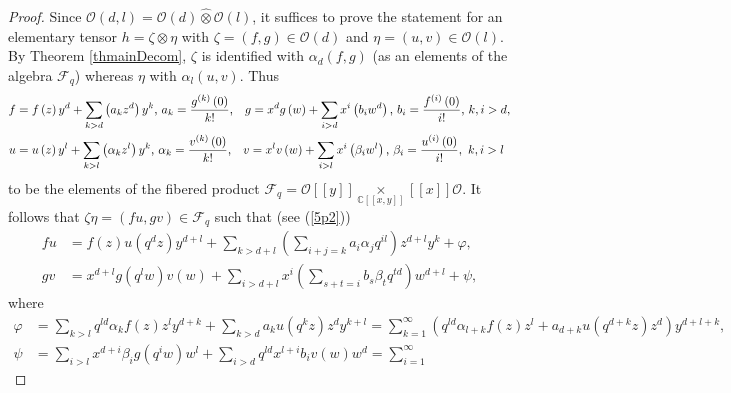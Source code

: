 \documentclass[12pt,reqno]{amsart}%
\theoremstyle{plain}
\numberwithin{theorem}{section} \numberwithin{equation}{section}
\numberwithin{lemma}{section}
\numberwithin{remark}{section}
\numberwithin{example}{section}
\numberwithin{proposition}{section}
\numberwithin{definition}{section}
\numberwithin{corollary}{section}
\begin{document}
\begin{proof}
Since $\mathcal{O}\left(  d,l\right)  =\mathcal{O}\left(  d\right)
\widehat{\otimes}\mathcal{O}\left(  l\right)  $, it suffices to prove the
statement for an elementary tensor $h=\zeta\otimes\eta$ with $\zeta=\left(
f,g\right)  \in\mathcal{O}\left(  d\right)  $ and $\eta=\left(  u,v\right)
\in\mathcal{O}\left(  l\right)  $. By Theorem \ref{thmainDecom}, $\zeta$ is
identified with $\alpha_{d}\left(  f,g\right)  $ (as an elements of the
algebra $\mathcal{F}_{q}$) whereas $\eta$ with $\alpha_{l}\left(  u,v\right)
$. Thus
\begin{align*}
f  &  =f\left(  z\right)  y^{d}+\sum_{k>d}\left(  a_{k}z^{d}\right)
y^{k}\text{, }a_{k}=\dfrac{g^{\left(  k\right)  }\left(  0\right)  }%
{k!}\text{,\quad}g=x^{d}g\left(  w\right)  +\sum_{i>d}x^{i}\left(  b_{i}%
w^{d}\right)  \text{, }b_{i}=\dfrac{f^{\left(  i\right)  }\left(  0\right)
}{i!}\text{, }k,i>d,\\
u  &  =u\left(  z\right)  y^{l}+\sum_{k>l}\left(  \alpha_{k}z^{l}\right)
y^{k}\text{, }\alpha_{k}=\dfrac{v^{\left(  k\right)  }\left(  0\right)  }%
{k!}\text{,\quad}v=x^{l}v\left(  w\right)  +\sum_{i>l}x^{i}\left(  \beta
_{i}w^{l}\right)  \text{, }\beta_{i}=\dfrac{u^{\left(  i\right)  }\left(
0\right)  }{i!},\text{ }k,i>l
\end{align*}
to be the elements of the fibered product $\mathcal{F}_{q}=\mathcal{O}\left[
\left[  y\right]  \right]  \underset{\mathbb{C}\left[  \left[  x,y\right]
\right]  }{\times}\left[  \left[  x\right]  \right]  \mathcal{O}$. It follows
that $\zeta\eta=\left(  fu,gv\right)  \in\mathcal{F}_{q}$ such that (see
(\ref{5p2}))
\begin{align*}
fu  &  =f\left(  z\right)  u\left(  q^{d}z\right)  y^{d+l}+\sum_{k>d+l}\left(
\sum_{i+j=k}a_{i}\alpha_{j}q^{il}\right)  z^{d+l}y^{k}+\varphi,\\
gv  &  =x^{d+l}g\left(  q^{l}w\right)  v\left(  w\right)  +\sum_{i>d+l}%
x^{i}\left(  \sum_{s+t=i}b_{s}\beta_{t}q^{td}\right)  w^{d+l}+\psi,
\end{align*}
where
\begin{align*}
\varphi &  =\sum_{k>l}q^{ld}\alpha_{k}f\left(  z\right)  z^{l}y^{d+k}%
+\sum_{k>d}a_{k}u\left(  q^{k}z\right)  z^{d}y^{k+l}=\sum_{k=1}^{\infty
}\left(  q^{ld}\alpha_{l+k}f\left(  z\right)  z^{l}+a_{d+k}u\left(
q^{d+k}z\right)  z^{d}\right)  y^{d+l+k},\\
\psi &  =\sum_{i>l}x^{d+i}\beta_{i}g\left(  q^{i}w\right)  w^{l}+\sum
_{i>d}q^{ld}x^{l+i}b_{i}v\left(  w\right)  w^{d}=\sum_{i=1}^{\infty}%

\end{align*}
\end{proof}
\end{document}
